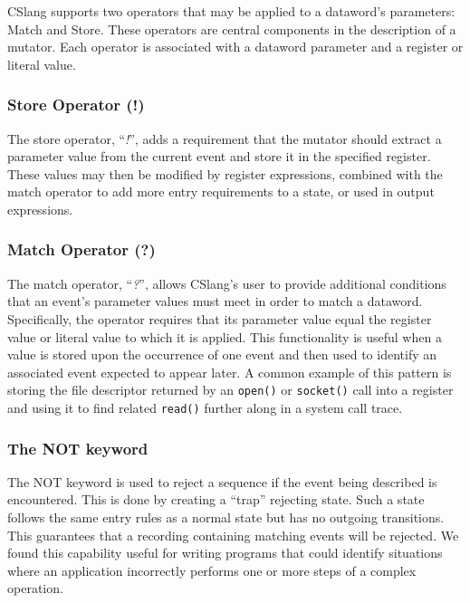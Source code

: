 CSlang supports two operators that may be applied to a dataword's
parameters: Match and Store.  These operators are central components in
the description of a mutator.  Each operator is associated with a dataword
parameter and a register or literal value.

\subsubsection{Store Operator (!)}

The store operator, ``\textit{!}'', adds a requirement that the
mutator should extract a parameter value from the current event and store
it in the specified register.  These values may then be modified by
register expressions, combined with the match operator to add more
entry requirements to a state, or used in output expressions.

\subsubsection{Match Operator (?)}

The match operator, ``\textit{?}'',
allows CSlang's user
to provide additional conditions
that an event's parameter values must meet
in order to match a dataword.
Specifically,
the operator requires
that its parameter value equal the
register value
or literal value
to which it is applied.
This functionality is
useful when a value is stored upon the occurrence of one event
and then used to identify an associated event expected to appear later.
A common example of this pattern is storing the file descriptor
returned by an {\tt open()} or {\tt socket()} call into a register
and using it to find related {\tt read()} further along in a system call
trace.

\subsubsection{The NOT keyword}
\label{subsub:NOT}

The NOT keyword is used to reject a sequence if the event being
described is encountered.  This is done by creating a ``trap''
rejecting state.  Such a state follows the same entry rules
as a normal state but has no outgoing transitions.  This guarantees that a
recording containing matching events will be rejected.
We found this capability useful for writing programs that could identify
situations where an application incorrectly performs one or more steps of a
complex operation.




